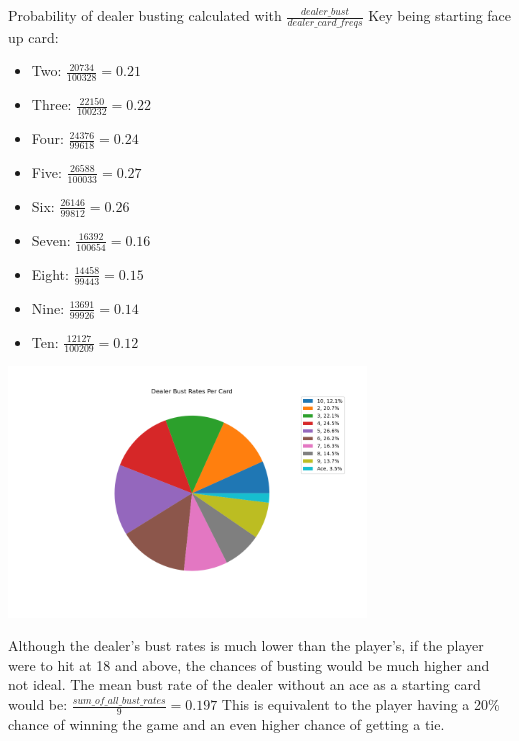 \documentclass{article}
\begin{document}
        \hspace{-0.5cm}Probability of dealer busting calculated with $\frac{dealer\_bust}{dealer\_card\_freqs}$ Key being starting face up card:
        \begin{itemize}
            \item Two: $\frac{20734}{100328} = 0.21$
            \item Three: $\frac{22150}{100232} = 0.22$
            \item Four: $\frac{24376}{99618} = 0.24$
            \item Five: $\frac{26588}{100033} = 0.27$
            \item Six: $\frac{26146}{99812} = 0.26$
            \item Seven: $\frac{16392}{100654} = 0.16$
            \item Eight: $\frac{14458}{99443} = 0.15$
            \item Nine: $\frac{13691}{99926} = 0.14$
            \item Ten: $\frac{12127}{100209} = 0.12$
        \end{itemize}

        \begin{center}
			\includegraphics[width=9.5cm]{pie-chart.png}
		\end{center}

        Although the dealer's bust rates is much lower than the player's, if the player were to hit at 18 and above, the chances of busting would be much higher and not ideal. The mean bust rate of the dealer without an ace as a starting card would be: $\frac{sum\_of\_all\_bust\_rates}{9} = 0.197$ 
        This is equivalent to the player having a 20\% chance of winning the game and an even higher chance of getting a tie. 

        \vspace{0.25cm}
\end{document}
